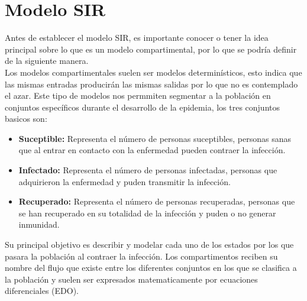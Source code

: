

%

\chapter{Modelo SIR}

Antes de establecer el modelo SIR, es importante conocer o tener la idea principal sobre lo que es un modelo compartimental, por lo que se podría definir de la siguiente manera.\\

Los modelos compartimentales suelen ser modelos determinísticos, esto indica que las mismas entradas producirán las mismas salidas por lo que no es contemplado el azar. Este tipo de modelos nos permmiten segmentar a la población en conjuntos específicos durante el desarrollo de la epidemia, los tres conjuntos basicos son:

\begin{itemize}
\item \textbf{Suceptible:} Representa el número de personas suceptibles, personas sanas que al entrar en contacto con la enfermedad pueden contraer la infección.\\

\item \textbf{Infectado:} Representa el número de personas infectadas, personas que adquirieron la enfermedad y puden transmitir la infección.\\

\item \textbf{Recuperado:} Representa el número de personas recuperadas, personas que se han recuperado en su totalidad de la infección y puden o no generar inmunidad.
\end{itemize}

Su principal objetivo es describir y modelar cada uno de los estados por los que pasara la población al contraer la infección.
Los compartimentos reciben su nombre del flujo que existe entre los diferentes conjuntos en los que se clasifica a la población y suelen ser expresados matematicamente por ecuaciones diferenciales (EDO).\\

